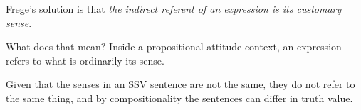 Frege's solution is that \emph{the indirect referent of an expression is its customary sense}.

What does that mean? Inside a propositional attitude context, an expression refers to what is ordinarily its sense.

Given that the senses in an SSV sentence are not the same, they do not refer to the same thing, and by compositionality the sentences can differ in truth value.
